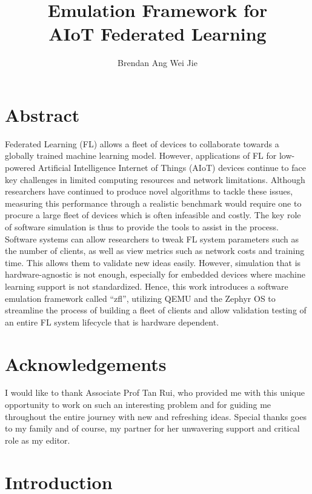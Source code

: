 \documentclass[12pt]{article}
\title{Emulation Framework for\protect\\ AIoT Federated Learning}
\author{Brendan Ang Wei Jie}
\begin{document}
\maketitle

\pagebreak
\section{Abstract}
Federated Learning (FL) allows a fleet of devices to collaborate towards a globally trained machine
learning model. However, applications of FL for low-powered Artificial Intelligence Internet of Things (AIoT)
devices continue to face key challenges in limited computing resources and network limitations. Although
researchers have continued to produce novel algorithms to tackle these issues, measuring this performance through a realistic benchmark would require
one to procure a large fleet of devices which is often infeasible and costly. The key role
of software simulation is thus to provide the tools to assist in the process. Software systems can allow
researchers to tweak FL system parameters such as the number of clients, as well as view metrics such
as network costs and training time. This allows them to validate new ideas easily. However,
simulation that is hardware-agnostic is not enough, especially for embedded devices where machine
learning support is not standardized. Hence, this work introduces a software emulation framework
called ``zfl'', utilizing QEMU
and the Zephyr OS to streamline the process of building a fleet of clients and allow validation
testing of an entire FL system lifecycle that is hardware dependent.

\section{Acknowledgements}
I would like to thank Associate Prof Tan Rui, who provided me with this unique opportunity to work
on such an interesting problem and for guiding me throughout the entire journey with new and
refreshing ideas. Special thanks goes to my family and of course, my
partner for her unwavering support and critical role as my editor.

\pagebreak
\tableofcontents
\listoffigures
\pagebreak

\section{Introduction}
\end{document}
